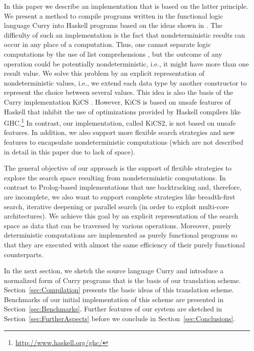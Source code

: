 \documentclass{llncs}
\begin{document}
In this paper we describe an implementation that is based
on the latter principle. We present a method to compile
programs written in the functional logic language Curry \cite{Hanus06Curry}
into Haskell programs based on the ideas shown
in \cite{BrasselFischer08IFL}.
The difficulty of such an implementation is the fact
that nondeterministic results can occur in any place of a
computation. Thus, one cannot separate logic computations
by the use of list comprehensions \cite{Wadler85},
but the outcome of any operation could be potentially nondeterministic,
i.e., it might have more than one result value.
We solve this problem by an explicit representation of
nondeterministic values, i.e., we extend each data type by
another constructor to represent the choice between several values.
This idea is also the basis of the Curry implementation KiCS
\cite{BrasselHuch07,BrasselHuch09}.
However, KiCS is based on unsafe features of Haskell
that inhibit the use of optimizations provided by Haskell compilers
like GHC.\footnote{\url{http://www.haskell.org/ghc/}}
In contrast, our implementation, called KiCS2, is not based on unsafe features.
In addition, we also support more flexible search strategies
and new features to encapsulate nondeterministic computations
(which are not described in detail in this paper due to lack of space).

The general objective of our approach is the support
of flexible strategies to explore the search space
resulting from nondeterministic computations.
In contrast to Prolog-based implementations
that use backtracking and, therefore, are incomplete,
we also want to support complete strategies like breadth-first search,
iterative deepening or parallel search (in order to exploit
multi-core architectures). We achieve this goal by an
explicit representation of the search space as data
that can be traversed by various operations.
Moreover, purely deterministic computations
are implemented as purely functional programs so that
they are executed with almost the same efficiency
of their purely functional counterparts.

In the next section, we sketch the source language Curry
and introduce a normalized form of Curry programs that is the
basis of our translation scheme.
Section~\ref{sec:Compilation} presents the basic ideas
of this translation scheme.
Benchmarks of our initial implementation of this scheme
are presented in Section~\ref{sec:Benchmarks}.
Further features of our system are sketched in
Section~\ref{sec:FurtherAspects}
before we conclude in Section~\ref{sec:Conclusions}.
\end{document}
